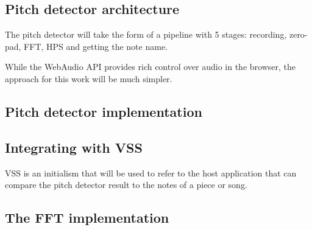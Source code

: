 \subsection{Pitch detector architecture}
The pitch detector will take the form of a pipeline with 5 stages: recording, zero-pad, FFT, HPS and getting the note name. 

While the WebAudio API provides rich control over audio in the browser, the approach for this work will be much simpler.  

\subsection{Pitch detector implementation}

\subsection{Integrating with VSS}
VSS is an initialism that will be used to refer to the host application that can compare the pitch detector result to the notes of a piece or song. 
\subsection{The FFT implementation}
